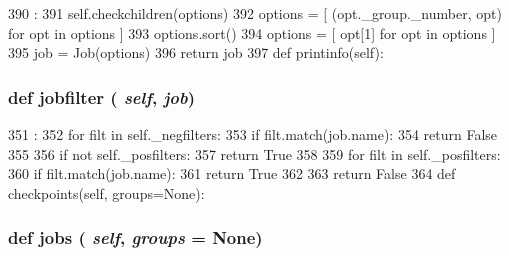 \begin{DoxyCode}
390                           :
391         self.checkchildren(options)
392         options = [ (opt._group._number, opt) for opt in options ]
393         options.sort()
394         options = [ opt[1] for opt in options ]
395         job = Job(options)
396         return job
397 
    def printinfo(self):
\end{DoxyCode}
\hypertarget{classm5_1_1util_1_1jobfile_1_1Configuration_a98dcd3648b5228f41f31ea81fe6bcac7}{
\subsubsection[{jobfilter}]{\setlength{\rightskip}{0pt plus 5cm}def jobfilter ( {\em self}, \/   {\em job})}}
\label{classm5_1_1util_1_1jobfile_1_1Configuration_a98dcd3648b5228f41f31ea81fe6bcac7}



\begin{DoxyCode}
351                             :
352         for filt in self._negfilters:
353             if filt.match(job.name):
354                 return False
355 
356         if not self._posfilters:
357             return True
358 
359         for filt in self._posfilters:
360             if filt.match(job.name):
361                 return True
362 
363         return False
364 
    def checkpoints(self, groups=None):
\end{DoxyCode}
\hypertarget{classm5_1_1util_1_1jobfile_1_1Configuration_ac8eea5228226fcecada3edc3539c868e}{
\subsubsection[{jobs}]{\setlength{\rightskip}{0pt plus 5cm}def jobs ( {\em self}, \/   {\em groups} = {\ttfamily None})}}
\label{classm5_1_1util_1_1jobfile_1_1Configuration_ac8eea5228226fcecada3edc3539c868e}



